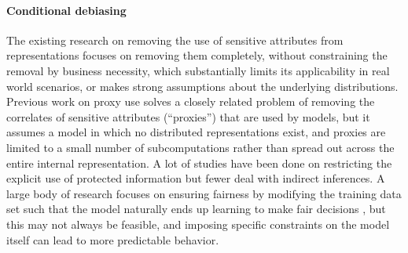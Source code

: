 \paragraph{Conditional debiasing} The existing research on removing the use of
sensitive attributes from
representations focuses on removing them completely, without constraining the
removal by business necessity, which substantially limits its applicability in
real world scenarios\cite{Beutel2017DataDA}, or makes strong assumptions about
the underlying distributions\cite{Kamishima}. Previous work on proxy use
\cite{Datta:2017:UPD:3133956.3134097} solves a closely related problem of removing
the correlates of sensitive attributes (``proxies'') that are used by models, but it
assumes a model in which no distributed representations exist, and proxies are
limited to a small number of subcomputations rather than spread out across the
entire internal representation. A lot of studies have been done on restricting
the explicit use of protected information\cite{TschantzDW12} but fewer deal with
indirect inferences. A large body of research focuses on ensuring fairness by
modifying the training data set such that the model naturally ends up learning
to make fair decisions
\cite{luong11knn, feldman15disparate, dwork11fairness, zemel13fair}, but this
may not always be feasible, and imposing specific constraints on the model itself
can lead to more predictable behavior.




